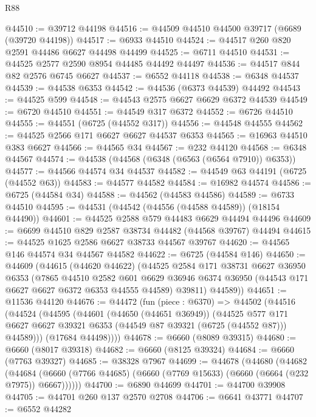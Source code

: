 \begin{lexlean}{R88}
\begin{coremodule}
@44510 := @39712 @44198
@44516 := @44509 @44510 @44500 @39717 (@6689 (@39720 @44198))
@44517 := @6933 @44510
@44524 := @44517 @260 @820 @2591 @44486 @6627 @44498 @44499
@44525 := @6711 @44510
@44531 := @44525 @2577 @2590 @8954 @44485 @44492 @44497
@44536 := @44517 @844 @82 @2576 @6745 @6627
@44537 := @6552 @44118
@44538 := @6348 @44537
@44539 := @44538 @6353
@44542 := @44536 (@6373 @44539) @44492
@44543 := @44525 @599
@44548 := @44543 @2575 @6627 @6629 @6372 @44539
@44549 := @6720 @44510
@44551 := @44549 @317 @6372
@44552 := @6726 @44510
@44555 := @44551 (@6725 (@44552 @317))
@44556 := @44548 @44555
@44562 := @44525 @2566 @171 @6627 @6627 @44537 @6353
@44565 := @16963 @44510 @383 @6627
@44566 := @44565 @34
@44567 := @232 @44120
@44568 := @6348 @44567
@44574 := @44538 (@44568 (@6348 (@6563 (@6564 @7910)) @6353))
@44577 := @44566 @44574 @34 @44537
@44582 := @44549 @63 @44191 (@6725 (@44552 @63))
@44583 := @44577 @44582
@44584 := @16982 @44574
@44586 := @6725 (@44584 @34)
@44588 := @44562 (@44583 @44586)
@44589 := @6733 @44510
@44595 := @44531 (@44542 (@44556 (@44588 @44589)) (@18154 @44490))
@44601 := @44525 @2588 @579 @44483 @6629 @44494 @44496
@44609 := @6699 @44510 @829 @2587 @38734 @44482 (@44568 @39767) @44494
@44615 := @44525 @1625 @2586 @6627 @38733 @44567 @39767
@44620 := @44565 @146 @44574 @34 @44567 @44582
@44622 := @6725 (@44584 @146)
@44650 := @44609
    (@44615
      (@44620 @44622)
      (@44525
        @2584
        @171
        @38731
        @6627
        @36950
        @6353
        (@7865
          @44510
          @2582
          @601
          @6629
          @36946
          @6374
          @36950
          (@44543 @171 @6627 @6627 @6372 @6353 @44555 @44589)
          @39811)
        @44589))
@44651 := @11536 @44120
@44676 := @44472
    (fun (piece : @6370) =>
    @44502
      (@44516
        (@44524
          (@44595
            (@44601
              (@44650 (@44651 @36949))
              (@44525
                @577
                @171
                @6627
                @6627
                @39321
                @6353
                (@44549 @87 @39321 (@6725 (@44552 @87)))
                @44589)))
          (@17684 @44498))))
@44678 := @6660 (@8089 @39315)
@44680 := @6660 (@8017 @39318)
@44682 := @6660 (@8125 @39324)
@44684 := @6660 (@7763 @39327)
@44685 := @38328 @7967
@44699 := @44678
    (@44680
      (@44682
        (@44684 (@6660 (@7766 @44685) (@6660 (@7769 @15633) (@6660 (@6664 (@232 @7975)) @6667))))))
@44700 := @6890 @44699
@44701 := @44700 @39908
@44705 := @44701 @260 @137 @2570 @2708
@44706 := @6641 @43771
@44707 := @6552 @44282

\end{coremodule}
\end{lexlean}
